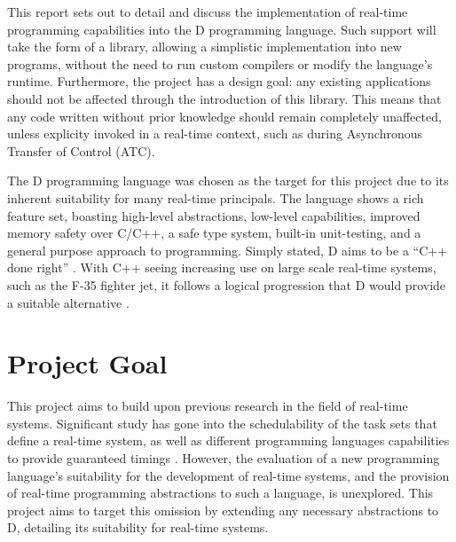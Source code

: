 






This report sets out to detail and discuss the implementation of real-time 
programming capabilities into the D programming language. 
Such support will take the form of a library, allowing a simplistic implementation 
into new programs, without the need to run custom compilers or 
modify the language's runtime. Furthermore, the project has a design 
goal: any existing applications should not be affected through the introduction 
of this library. This means that any code written without prior knowledge should 
remain completely unaffected, unless explicity invoked in a real-time context,
such as during Asynchronous Transfer of Control (ATC). 
\par\bigskip\noindent
The D programming language was chosen as the target for this project due to its 
inherent suitability for many real-time principals. The language shows a rich 
feature set, boasting high-level abstractions, low-level capabilities, 
improved memory safety over C/C++, a safe type 
system, built-in unit-testing, and a general purpose approach 
to programming. Simply stated, D aims to be a ``C++ done right'' \cite{qznc-tutorial}. 
With C++ seeing increasing use on large scale real-time systems, such as the F-35 
fighter jet, it follows a logical progression that D would provide a suitable 
alternative \cite{f35}.
\section{Project Goal} %
This project aims to build upon previous research in the field of real-time systems. 
Significant study has gone into the schedulability of the task sets that 
define a real-time system, as well as different programming languages capabilities 
to provide guaranteed timings \cite{burns-sched-analysis,atc-article}. 
However, the evaluation of a new programming language's suitability for the 
development of real-time systems, and the provision of real-time programming 
abstractions to such a language, is unexplored. 
This project aims to target this omission by extending any necessary 
abstractions to D, detailing its suitability for real-time systems.
